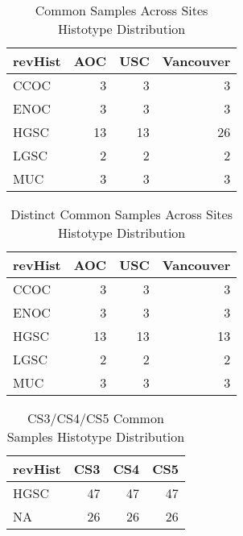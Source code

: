 \documentclass[
]{report}
\begin{document}
\begin{table}

\caption{\label{tab:common-dist-sites}Common Samples Across Sites Histotype Distribution}
\centering
\begin{tabular}[t]{l|r|r|r}
\hline
revHist & AOC & USC & Vancouver\\
\hline
CCOC & 3 & 3 & 3\\
\hline
ENOC & 3 & 3 & 3\\
\hline
HGSC & 13 & 13 & 26\\
\hline
LGSC & 2 & 2 & 2\\
\hline
MUC & 3 & 3 & 3\\
\hline
\end{tabular}
\end{table}

\begin{table}

\caption{\label{tab:common-dist-sites-distinct}Distinct Common Samples Across Sites Histotype Distribution}
\centering
\begin{tabular}[t]{l|r|r|r}
\hline
revHist & AOC & USC & Vancouver\\
\hline
CCOC & 3 & 3 & 3\\
\hline
ENOC & 3 & 3 & 3\\
\hline
HGSC & 13 & 13 & 13\\
\hline
LGSC & 2 & 2 & 2\\
\hline
MUC & 3 & 3 & 3\\
\hline
\end{tabular}
\end{table}

\begin{table}

\caption{\label{tab:cs345-overlap}CS3/CS4/CS5 Common Samples Histotype Distribution}
\centering
\begin{tabular}[t]{l|r|r|r}
\hline
revHist & CS3 & CS4 & CS5\\
\hline
HGSC & 47 & 47 & 47\\
\hline
NA & 26 & 26 & 26\\
\hline
\end{tabular}
\end{table}
\end{document}
